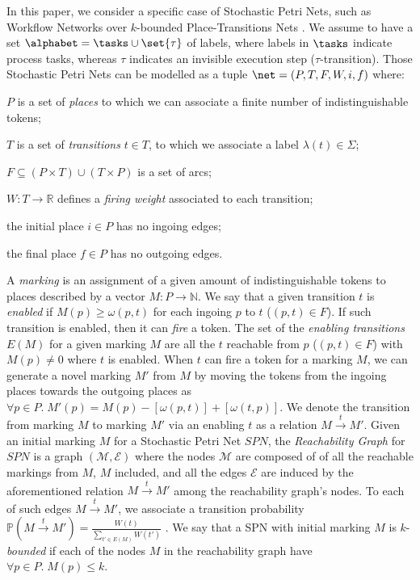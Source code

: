 In this paper, we consider a specific case of Stochastic Petri Nets, such as Workflow Networks over $k$-bounded Place-Transitions Nets \cite{MarsanCB84,Desel1998,RoggeSoltiAW13}. We assume to have a set $\alphabet = \tasks \cup \set{\tau}$ of labels, where labels in $\tasks$ indicate process tasks, whereas $\tau$ indicates an invisible execution step ($\tau$-transition). %
 Those Stochastic Petri Nets can be modelled as a tuple $\net=(P,T,F,W,i,f)$ where:
\begin{mylist}
	\item $P$ is a set of \textit{places} to which we can associate a finite number of indistinguishable tokens;
	\item $T$ is a set of \textit{transitions} $t\in T$, to which we associate a label $\lambda(t)\in\Sigma$;
	\item $F\subseteq (P\times T)\cup (T\times P)$ is a set of arcs; %
	\item $W\colon T\to \mathbb{R}$ defines a \textit{firing weight} associated to each transition;
	\item the initial place $i\in P$ has no ingoing edges; %
	\item the final place $f\in P$ has no outgoing edges. %
\end{mylist}
A \textit{marking} is an assignment of a given amount of indistinguishable tokens to places described by a vector $M\colon P\to \mathbb{N}$. We say that a given transition $t$ is \textit{enabled} if $M(p)\geq \omega(p,t)$ for each ingoing $p$ to $t$ ($(p,t)\in F$). If such transition is enabled, then it can \textit{fire} a token. The set of the \textit{enabling transitions} $E(M)$ for a given marking $M$ are all the $t$ reachable from $p$ ($(p,t)\in F$) with $M(p)\neq 0$ where $t$ is enabled. When $t$ can fire a token for a marking $M$, we can generate a novel marking $M'$ from $M$ by moving the tokens from the ingoing places towards the outgoing places as 
$\forall p\in P.\; M'(p)=M(p)-[\omega(p,t)]+[\omega(t,p)]$. 
We denote the transition from marking $M$ to marking $M'$ via an enabling $t$ as a relation $M\overset{t}{\to}M'$. Given an initial marking $M$ for a Stochastic Petri Net $SPN$,  the \textit{Reachability Graph} for $SPN$ is a graph $(\mathcal{M},\mathcal{E})$ where the nodes  $\mathcal{M}$ are composed of of all the reachable markings from $M$, $M$ included, and all the edges $\mathcal{E}$ are induced by the aforementioned relation $M\overset{t}{\to}M'$ among the reachability graph's nodes. To each of such edges $M\overset{t}{\to}M'$, we associate a transition probability $\mathbb{P}\left(M\overset{t}{\to}M'\right)=\frac{W(t)}{\sum_{t'\in E(M)}W(t')}$ \cite{spdwe}. We say that a SPN with initial marking $M$ is $k$-\textit{bounded} if each of the nodes $M$ in the reachability graph have $\forall p\in P.\; M(p)\leq k$. 


